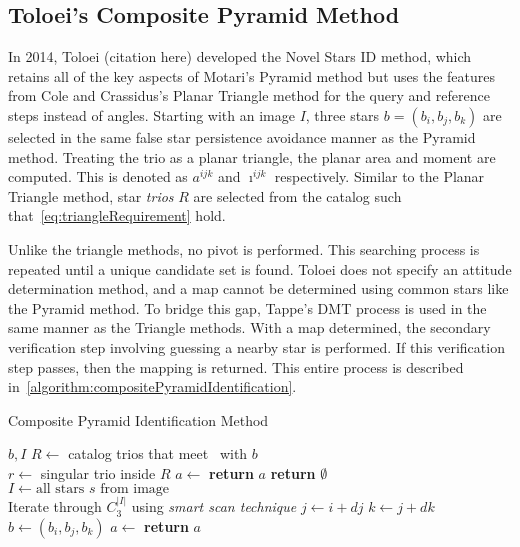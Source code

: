 \subsection{Toloei's Composite Pyramid Method}\label{subsec:toloei'sCompositePyramidMethod}
In 2014, Toloei (citation here) developed the Novel Stars ID method, which retains all of the key aspects of Motari's
Pyramid method but uses the features from Cole and Crassidus's Planar Triangle method for the query and reference steps
instead of angles.
Starting with an image $I$, three stars $b = (b_i, b_j, b_k)$ are selected in the same false star persistence avoidance
manner as the Pyramid method.
Treating the trio as a planar triangle, the planar area and moment are computed.
This is denoted as $a^{ijk}$ and $\imath^{ijk}$ respectively.
Similar to the Planar Triangle method, star \textit{trios} $R$ are selected from the catalog such
that~\autoref{eq:triangleRequirement} hold.

Unlike the triangle methods, no pivot is performed.
This searching process is repeated until a unique candidate set is found.
Toloei does not specify an attitude determination method, and a map cannot be determined using common
stars like the Pyramid method.
To bridge this gap, Tappe's DMT process is used in the same manner as the Triangle methods.
With a map determined, the secondary verification step involving guessing a nearby star is performed.
If this verification step passes, then the mapping is returned.
This entire process is described in~\autoref{algorithm:compositePyramidIdentification}.

\begin{algorithm}
    \caption{Composite Pyramid Identification Method} \label{algorithm:compositePyramidIdentification}
    \begin{algorithmic}[1]
         {$b, I$}
        \State $R \gets $ catalog trios that meet~ with $b$
        \\
        \State $r \gets $ singular trio inside $R$
        \State $a \gets $ 
        \State \textbf{return} $a$
        \EndIf
        \EndIf
        \State \textbf{return } $\emptyset$
        \EndFunction
        \\
        \State $I \gets \text{all stars } s \text{ from image}$
        \\
        \LineComment Iterate through $C^{|I|}_3$ using \textit{smart scan technique}
        \State $j \gets i + dj$
        \State $k \gets j + dk$
        \\
        \State $b \gets (b_i, b_j, b_k)$
        \State $a \gets$ 
        \State \textbf{return} $a$
        \EndIf
        \EndFor
        \EndFor
        \EndFor
        \EndProcedure
    \end{algorithmic}
\end{algorithm}

